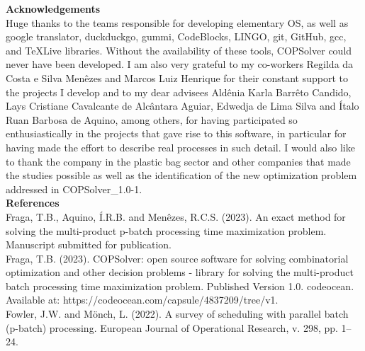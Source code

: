 \documentclass[11pt, letterpaper]{article}
\begin{document}
\vskip0.3cm
\noindent
\textbf{Acknowledgements}\\
Huge thanks to the teams responsible for developing elementary OS, as well as google translator, duckduckgo, gummi, CodeBlocks, LINGO, git, GitHub, gcc, and TeXLive libraries. Without the availability of these tools, COPSolver could never have been developed. I am also very grateful to my co-workers Regilda da Costa e Silva Menêzes and Marcos Luiz Henrique for their constant support to the projects I develop and to my dear advisees Aldênia Karla Barrêto Candido, Lays Cristiane Cavalcante de Alcântara Aguiar, Edwedja de Lima Silva and Ítalo Ruan Barbosa de Aquino, among others, for having participated so enthusiastically in the projects that gave rise to this software, in particular for having made the effort to describe real processes in such detail. I would also like to thank the company in the plastic bag sector and other companies that made the studies possible as well as the identification of the new optimization problem addressed in COPSolver\_1.0-1. \\

\noindent
\textbf{References}\\

Fraga, T.B., Aquino, Í.R.B. and Menêzes, R.C.S. (2023). An exact method for solving the multi-product p-batch processing time maximization problem. Manuscript submitted for publication.  \\

Fraga, T.B. (2023). COPSolver: open source software for solving combinatorial optimization and other decision problems - library for solving the multi-product batch processing time maximization problem. Published Version 1.0. codeocean. Available at: https://codeocean.com/capsule/4837209/tree/v1.  \\

Fowler, J.W. and Mönch, L. (2022). A survey of scheduling with parallel batch (p-batch) processing. European Journal of Operational Research, v. 298, pp. 1–24. \\


\vskip 1.5cm
\end{document}
